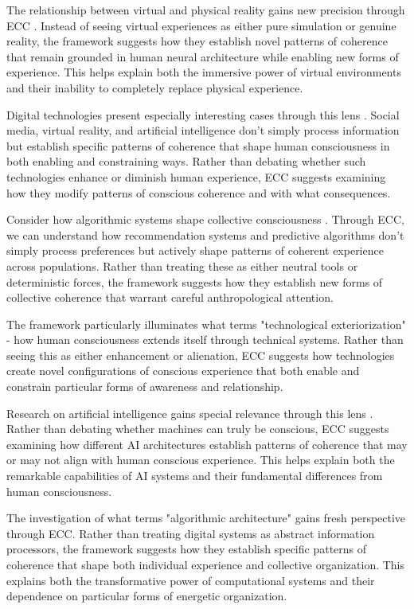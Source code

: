 \begin{refsection}
The relationship between virtual and physical reality gains new precision through ECC \cite{turkle2011alone}. Instead of seeing virtual experiences as either pure simulation or genuine reality, the framework suggests how they establish novel patterns of coherence that remain grounded in human neural architecture while enabling new forms of experience. This helps explain both the immersive power of virtual environments and their inability to completely replace physical experience.

Digital technologies present especially interesting cases through this lens \cite{hayles2012how}. Social media, virtual reality, and artificial intelligence don't simply process information but establish specific patterns of coherence that shape human consciousness in both enabling and constraining ways. Rather than debating whether such technologies enhance or diminish human experience, ECC suggests examining how they modify patterns of conscious coherence and with what consequences.

Consider how algorithmic systems shape collective consciousness \cite{noble2018algorithms}. Through ECC, we can understand how recommendation systems and predictive algorithms don't simply process preferences but actively shape patterns of coherent experience across populations. Rather than treating these as either neutral tools or deterministic forces, the framework suggests how they establish new forms of collective coherence that warrant careful anthropological attention.

The framework particularly illuminates what \cite{stiegler2010taking} terms "technological exteriorization" - how human consciousness extends itself through technical systems. Rather than seeing this as either enhancement or alienation, ECC suggests how technologies create novel configurations of conscious experience that both enable and constrain particular forms of awareness and relationship.

Research on artificial intelligence gains special relevance through this lens \cite{clark2003natural}. Rather than debating whether machines can truly be conscious, ECC suggests examining how different AI architectures establish patterns of coherence that may or may not align with human conscious experience. This helps explain both the remarkable capabilities of AI systems and their fundamental differences from human consciousness.

The investigation of what \cite{parisi2013contagious} terms "algorithmic architecture" gains fresh perspective through ECC. Rather than treating digital systems as abstract information processors, the framework suggests how they establish specific patterns of coherence that shape both individual experience and collective organization. This explains both the transformative power of computational systems and their dependence on particular forms of energetic organization.


\end{refsection}
